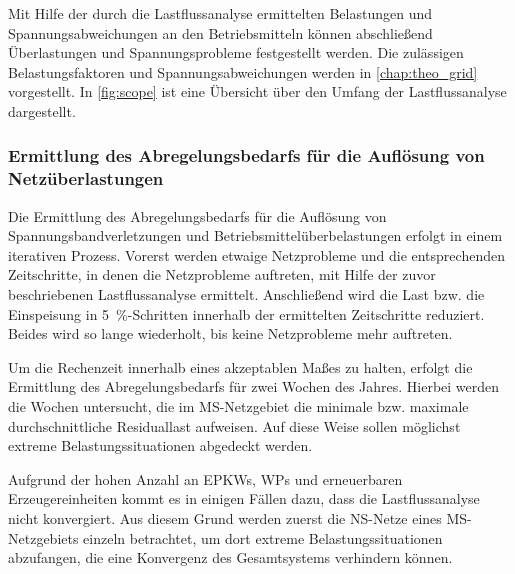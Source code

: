 Mit Hilfe der durch die Lastflussanalyse ermittelten Belastungen und Spannungsabweichungen an den Betriebsmitteln können abschließend Überlastungen und Spannungsprobleme festgestellt werden.
Die zulässigen Belastungsfaktoren und Spannungsabweichungen werden in \autoref{chap:theo_grid} vorgestellt.
In \autoref{fig:scope} ist eine Übersicht über den Umfang der Lastflussanalyse dargestellt.




\subsubsection{Ermittlung des Abregelungsbedarfs für die Auflösung von Netzüberlastungen}

Die Ermittlung des Abregelungsbedarfs für die Auflösung von Spannungsbandverletzungen und Betriebsmittelüberbelastungen erfolgt in einem iterativen Prozess.
Vorerst werden etwaige Netzprobleme und die entsprechenden Zeitschritte, in denen die Netzprobleme auftreten, mit Hilfe der zuvor beschriebenen Lastflussanalyse ermittelt.
Anschließend wird die Last bzw. die Einspeisung in \SI{5}{\percent}-Schritten innerhalb der ermittelten Zeitschritte reduziert.
Beides wird so lange wiederholt, bis keine Netzprobleme mehr auftreten.\medskip

Um die Rechenzeit innerhalb eines akzeptablen Maßes zu halten, erfolgt die Ermittlung des Abregelungsbedarfs für zwei Wochen des Jahres.
Hierbei werden die Wochen untersucht, die im \gls{MS}-Netzgebiet die minimale bzw. maximale durchschnittliche Residuallast aufweisen.
Auf diese Weise sollen möglichst extreme Belastungssituationen abgedeckt werden.\medskip

Aufgrund der hohen Anzahl an \glspl{EPKW}, \glspl{WP} und erneuerbaren Erzeugereinheiten kommt es in einigen Fällen dazu, dass die Lastflussanalyse nicht konvergiert.
Aus diesem Grund werden zuerst die \gls{NS}-Netze eines \gls{MS}-Netzgebiets einzeln betrachtet, um dort extreme Belastungssituationen abzufangen, die eine Konvergenz des Gesamtsystems verhindern können.

